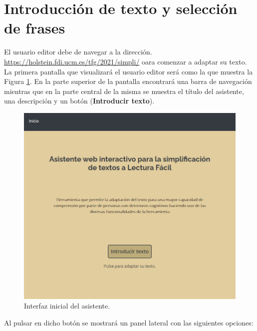 \section{Introducción de texto y selección de frases}
\label{introduccionTextoYFrases}
 El usuario editor debe de navegar a la dirección. \url{https://holstein.fdi.ucm.es/tfg/2021/simpli/} oara comenzar a adaptar su texto.
 La primera pantalla que visualizará el usuario editor será como la que muestra la Figura \ref{fig:interfazInicial}. En la parte superior de la pantalla encontrará una barra de navegación mientras que en la parte central de la misma se muestra el título del asistente, una descripción y un botón (\textbf{Introducir texto}). 
  \begin{figure}[h!]
 	\centering
 	
 	
 	\includegraphics[scale=1]{Imagenes/Figuras/InterfazInicial}
 	
 	
 	\caption{Interfaz inicial del asistente.}
 	\label{fig:interfazInicial}
 \end{figure}
 
 Al pulsar en dicho botón se mostrará un panel lateral con las siguientes opciones:
 
